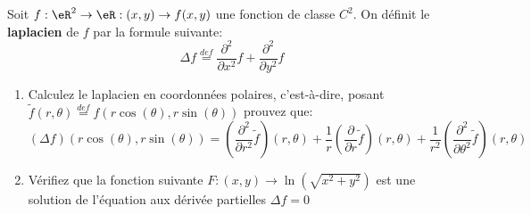 
\begin{exercice}\label{exo0061}

Soit $f:\eR^2 \rightarrow \eR: (x, y) \rightarrow f(x,y)$ une
fonction de classe $C^2$. On définit le {\bf laplacien} de $f$ par la
formule suivante:
\[
\Delta f \stackrel{def}= \frac{\partial ^2}{\partial x^2 } f +
\frac{\partial^2}{\partial y^2} f
\]
\begin{enumerate}
\item
Calculez le laplacien en coordonnées polaires, c'est-\`a-dire, posant
$\tilde{f} (r, \theta) \stackrel{def}= f(r\cos(\theta),r\sin(\theta))$
prouvez que:
\[
(\Delta f)(r\cos(\theta), r\sin(\theta))
= (\frac{\partial^2}{\partial r^2}\tilde{f})(r, \theta)
+ \frac{1}{r} (\frac{\partial}{\partial r}\tilde{f})(r,\theta)
+ \frac{1}{r^2} (\frac{\partial^2}{\partial \theta^2}\tilde{f})(r,\theta)
\]
\item
Vérifiez que la fonction suivante $F:( x,y) \rightarrow \ln(\sqrt{x^2+y^2})
$ est une solution de l'équation aux dérivée partielles $\Delta f =0$
\end{enumerate}
 
\end{exercice}
